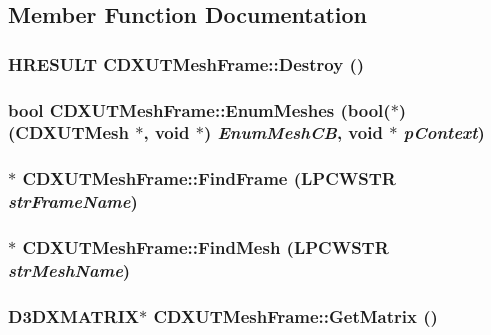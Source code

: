 \subsection{Member Function Documentation}
\hypertarget{class_c_d_x_u_t_mesh_frame_a50ee36ed2f7029f26687ac3704e5b88e}{
\subsubsection[{Destroy}]{\setlength{\rightskip}{0pt plus 5cm}HRESULT CDXUTMeshFrame::Destroy ()}}
\label{class_c_d_x_u_t_mesh_frame_a50ee36ed2f7029f26687ac3704e5b88e}
\hypertarget{class_c_d_x_u_t_mesh_frame_a6998560440db07c6c62bb84938c65633}{
\subsubsection[{EnumMeshes}]{\setlength{\rightskip}{0pt plus 5cm}bool CDXUTMeshFrame::EnumMeshes (bool($\ast$)({\bf CDXUTMesh} $\ast$, void $\ast$) {\em EnumMeshCB}, \/  void $\ast$ {\em pContext})}}
\label{class_c_d_x_u_t_mesh_frame_a6998560440db07c6c62bb84938c65633}
\hypertarget{class_c_d_x_u_t_mesh_frame_a6ac3d9657dc0cc9430f315b1fcc38b6f}{
\subsubsection[{FindFrame}]{ $\ast$ CDXUTMeshFrame::FindFrame (LPCWSTR {\em strFrameName})}}
\label{class_c_d_x_u_t_mesh_frame_a6ac3d9657dc0cc9430f315b1fcc38b6f}
\hypertarget{class_c_d_x_u_t_mesh_frame_a65c4d08739e59490b4e3792a065fd149}{
\subsubsection[{FindMesh}]{ $\ast$ CDXUTMeshFrame::FindMesh (LPCWSTR {\em strMeshName})}}
\label{class_c_d_x_u_t_mesh_frame_a65c4d08739e59490b4e3792a065fd149}
\hypertarget{class_c_d_x_u_t_mesh_frame_a64ed732741542d6111824d2101dd6374}{
\subsubsection[{GetMatrix}]{\setlength{\rightskip}{0pt plus 5cm}D3DXMATRIX$\ast$ CDXUTMeshFrame::GetMatrix ()}}

